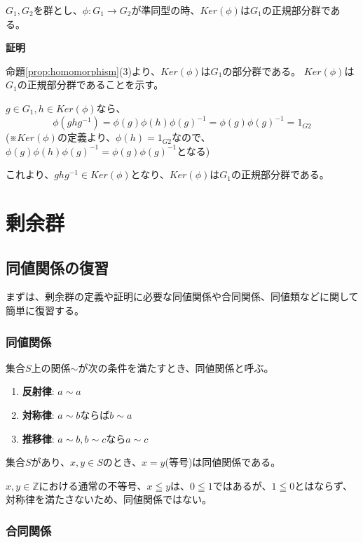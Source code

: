 \documentclass[dvipdfmx,autodetect-engine]{jsarticle}
\begin{document}
\prop $G_1, G_2$を群とし、$\phi: G_1 \to G_2$が準同型の時、$Ker(\phi)$は$G_1$の正規部分群である。

{\bf 証明}

命題\ref{prop:homomorphism}(3)より、$Ker(\phi)$は$G_1$の部分群である。
$Ker(\phi)$は$G_1$の正規部分群であることを示す。

$g \in G_1, h \in Ker(\phi)$なら、
$$
\phi(ghg^{-1}) = \phi(g)\phi(h)\phi(g)^{-1} = \phi(g)\phi(g)^{-1} = 1_{G2}
$$
(※$Ker(\phi)$の定義より、$\phi(h) = 1_{G2}$なので、$\phi(g)\phi(h)\phi(g)^{-1} = \phi(g)\phi(g)^{-1}$となる)

これより、$ghg^{-1} \in Ker(\phi)$となり、$Ker(\phi)$は$G_1$の正規部分群である。

\section{剰余群}

\subsection{同値関係の復習}

まずは、剰余群の定義や証明に必要な同値関係や合同関係、同値類などに関して簡単に復習する。

\subsubsection{同値関係}

集合$S$上の関係$\sim$が次の条件を満たすとき、同値関係と呼ぶ。


\begin{enumerate}
\renewcommand{\labelenumi}{(\arabic{enumi})}
\item {\bf 反射律}: $a \sim a$
\item {\bf 対称律}: $a \sim b$ならば$b \sim a$
\item {\bf 推移律}: $a \sim b, b \sim c$なら$a \sim c$
\end{enumerate}

\exam 集合$S$があり、$x, y \in S$のとき、$x = y$(等号)は同値関係である。

\exam $x, y \in \mathbb{Z}$における通常の不等号、$x \leqq y$は、$0 \leqq 1$ではあるが、$1 \leqq 0$とはならず、対称律を満たさないため、同値関係ではない。

\subsubsection{合同関係}
\end{document}
